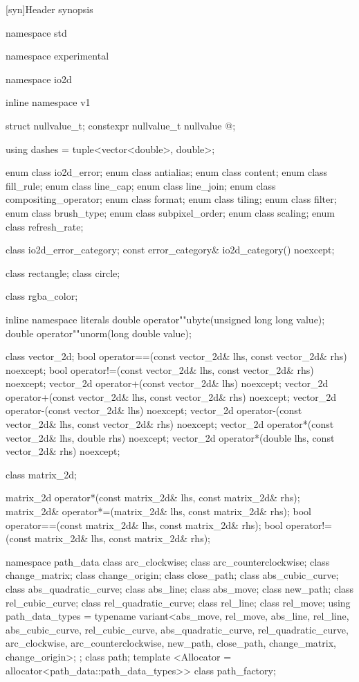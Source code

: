 [syn]{Header  synopsis}

%
\begin{codeblock}

namespace std { namespace experimental {
  namespace io2d { inline namespace v1 {

  struct nullvalue_t;
  constexpr nullvalue_t nullvalue{ @\impdef@ };

  using dashes = tuple<vector<double>, double>;

  enum class io2d_error;
  enum class antialias;
  enum class content;
  enum class fill_rule;
  enum class line_cap;
  enum class line_join;
  enum class compositing_operator;
  enum class format;
  enum class tiling;
  enum class filter;
  enum class brush_type;
  enum class subpixel_order;
  enum class scaling;
  enum class refresh_rate;

  class io2d_error_category;
  const error_category& io2d_category() noexcept;

  class rectangle;
  class circle;

  class rgba_color;

  inline namespace literals {
    double operator""ubyte(unsigned long long value);
    double operator""unorm(long double value);
  }
  
  class vector_2d;
  bool operator==(const vector_2d& lhs, const vector_2d& rhs) noexcept;
  bool operator!=(const vector_2d& lhs, const vector_2d& rhs) noexcept;
  vector_2d operator+(const vector_2d& lhs) noexcept;
  vector_2d operator+(const vector_2d& lhs, const vector_2d& rhs) noexcept;
  vector_2d operator-(const vector_2d& lhs) noexcept;
  vector_2d operator-(const vector_2d& lhs, const vector_2d& rhs) noexcept;
  vector_2d operator*(const vector_2d& lhs, double rhs) noexcept;
  vector_2d operator*(double lhs, const vector_2d& rhs) noexcept;

  class matrix_2d;

  matrix_2d operator*(const matrix_2d& lhs, const matrix_2d& rhs);
  matrix_2d& operator*=(matrix_2d& lhs, const matrix_2d& rhs);
  bool operator==(const matrix_2d& lhs, const matrix_2d& rhs);
  bool operator!=(const matrix_2d& lhs, const matrix_2d& rhs);

  namespace path_data {
    class arc_clockwise;
    class arc_counterclockwise;
    class change_matrix;
    class change_origin;
    class close_path;
    class abs_cubic_curve;
    class abs_quadratic_curve;
    class abs_line;
    class abs_move;
    class new_path;
    class rel_cubic_curve;
    class rel_quadratic_curve;
    class rel_line;
    class rel_move;
    using path_data_types = typename variant<abs_move, rel_move,
      abs_line, rel_line, abs_cubic_curve, rel_cubic_curve, 
      abs_quadratic_curve, rel_quadratic_curve, arc_clockwise, 
      arc_counterclockwise, new_path, close_path, change_matrix, change_origin>;
  };
  class path;
  template <Allocator = allocator<path_data::path_data_types>>
  class path_factory;
  
}}}}
\end{codeblock}
